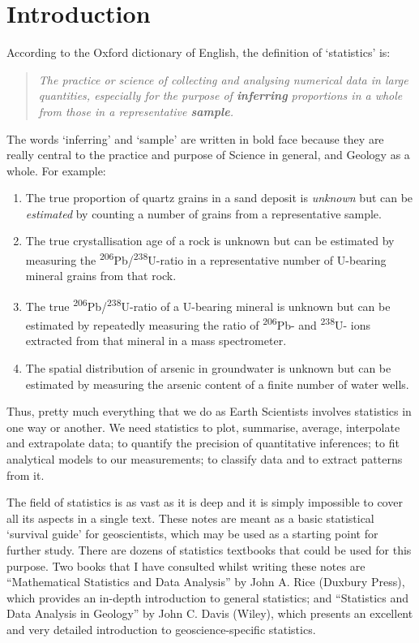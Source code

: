\chapter{Introduction}
\label{ch:introduction}

According to the Oxford dictionary of English, the definition of
`statistics' is:

\begin{quote}
  \textit{The practice or science of collecting and analysing
    numerical data in large quantities, especially for the purpose of
    \textbf{inferring} proportions in a whole from those in a
    representative \textbf{sample}.}
\end{quote}

The words `inferring' and `sample' are written in bold face because
they are really central to the practice and purpose of Science in
general, and Geology as a whole. For example:

\begin{enumerate}
\item The true proportion of quartz grains in a sand deposit is
  \emph{unknown} but can be \emph{estimated} by counting a number of
  grains from a representative sample.
\item The true crystallisation age of a rock is unknown but can be
  estimated by measuring the
  \textsuperscript{206}Pb/\textsuperscript{238}U-ratio in a
  representative number of U-bearing mineral grains from that rock.
\item The true \textsuperscript{206}Pb/\textsuperscript{238}U-ratio of
  a U-bearing mineral is unknown but can be estimated by repeatedly
  measuring the ratio of \textsuperscript{206}Pb- and
  \textsuperscript{238}U- ions extracted from that mineral in a mass
  spectrometer.
\item The spatial distribution of arsenic in groundwater is unknown
  but can be estimated by measuring the arsenic content of a finite
  number of water wells.
\end{enumerate}

Thus, pretty much everything that we do as Earth Scientists involves
statistics in one way or another. We need statistics to plot,
summarise, average, interpolate and extrapolate data; to quantify the
precision of quantitative inferences; to fit analytical models to our
measurements; to classify data and to extract patterns from it.\medskip

The field of statistics is as vast as it is deep and it is simply
impossible to cover all its aspects in a single text. These notes are
meant as a basic statistical `survival guide' for geoscientists, which
may be used as a starting point for further study. There are dozens of
statistics textbooks that could be used for this purpose. Two books
that I have consulted whilst writing these notes are ``Mathematical
Statistics and Data Analysis'' by John A. Rice (Duxbury Press), which
provides an in-depth introduction to general statistics; and
``Statistics and Data Analysis in Geology'' by John C. Davis (Wiley),
which presents an excellent and very detailed introduction to
geoscience-specific statistics.\medskip

